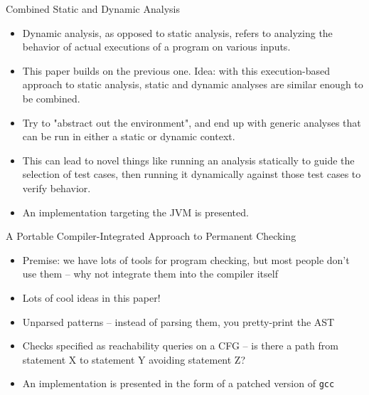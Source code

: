 \documentclass{beamer}
\begin{document}
\begin{frame}{Combined Static and Dynamic Analysis}
\begin{itemize}
\item Dynamic analysis, as opposed to static analysis, refers to analyzing
the behavior of actual executions of a program on various inputs.
\item This paper builds on the previous one. Idea: with this execution-based
approach to static analysis, static and dynamic analyses are similar enough
to be combined.
\item Try to "abstract out the environment", and end up with generic
analyses that can be run in either a static or dynamic context.
\item This can lead to novel things like running an analysis statically to
guide the selection of test cases, then running it dynamically against
those test cases to verify behavior.
\item An implementation targeting the JVM is presented.
\end{itemize}
\end{frame}

\begin{frame}{A Portable Compiler-Integrated Approach to Permanent Checking}
\begin{itemize}
\item Premise: we have lots of tools for program checking, but most people
don't use them -- why not integrate them into the compiler itself
\item Lots of cool ideas in this paper!
\item Unparsed patterns -- instead of parsing them, you pretty-print the AST
\item Checks specified as reachability queries on a CFG -- is there a path
from statement X to statement Y avoiding statement Z?
\item An implementation is presented in the form of a patched
version of {\tt gcc}
\end{itemize}
\end{frame}
\end{document}
